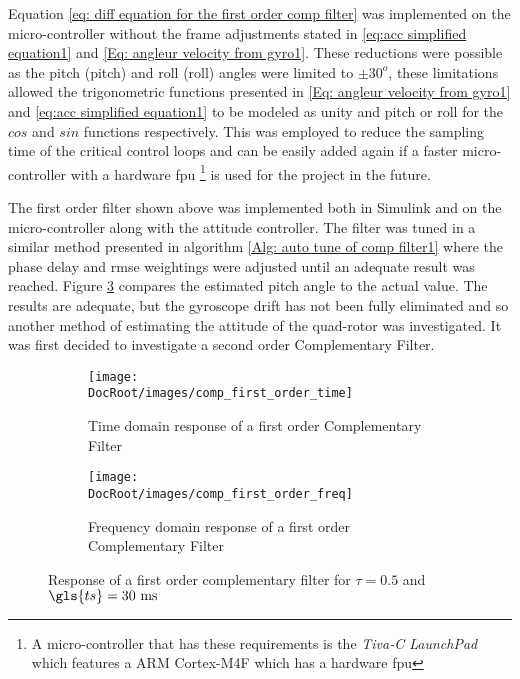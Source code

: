 Equation \ref{eq: diff equation for the first order comp filter} was implemented on the micro-controller without the frame adjustments stated in \eqref{eq:acc simplified equation1} and \eqref{Eq: angleur velocity from gyro1}. These reductions were possible as the pitch (\gls{pitch}) and roll (\gls{roll}) angles were limited to $\pm 30^o$, these limitations allowed the trigonometric functions presented in \eqref{Eq: angleur velocity from gyro1} and \eqref{eq:acc simplified equation1} to be modeled as unity and \gls{pitch} or \gls{roll} for the $cos$ and $sin$ functions respectively. This was employed to reduce the sampling time of the critical control loops and can be easily added again if a faster micro-controller with a hardware \gls{fpu} \footnote{A micro-controller that has these requirements is the \textit{Tiva-C LaunchPad} which features a ARM Cortex-M4F which has a hardware \gls{fpu}} is used for the project in the future.  

The first order filter shown above was implemented both in Simulink and on the micro-controller along with the attitude controller. The filter was tuned in a similar method presented in algorithm \ref{Alg: auto tune of comp filter1} where the phase delay and \gls{rmse} weightings were adjusted until an adequate result was reached. Figure \ref{fig first order comp time and freq responce} compares the estimated pitch angle to the actual value. The results are adequate, but the gyroscope drift has not been fully eliminated and so another method of estimating the attitude of the quad-rotor was investigated. It was first decided to investigate a second order Complementary Filter. 

\begin{figure}[h]
	\centering
	\begin{subfigure}{0.32\textwidth}
		\texttt{[image: \\DocRoot/images/comp\_first\_order\_time]}
		\caption{Time domain response of a first order Complementary Filter}
		\label{fg: Time domain comparison responce of the first order comp filter}
	\end{subfigure}%
	\hspace{3cm}
	\begin{subfigure}{0.32\textwidth}
		\texttt{[image: \\DocRoot/images/comp\_first\_order\_freq]}
		\caption{Frequency domain response of a first order Complementary Filter}
		\label{fg: Frequency domain responce of the first order comp filter}
	\end{subfigure}
	
	\caption{Response of a first order complementary filter for $\tau = 0.5$ and ${\gls{ts}} = 30~\mathrm{ms}$ }
	\label{fig first order comp time and freq responce}
\end{figure}

